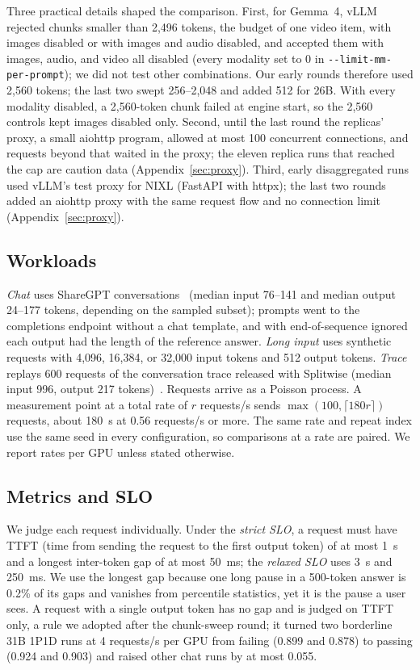\documentclass[11pt]{article}
\begin{document}
Three practical details shaped the comparison. First, for Gemma~4, vLLM rejected chunks smaller than 2,496 tokens, the budget of one video item, with images disabled or with images and audio disabled, and accepted them with images, audio, and video all disabled (every modality set to 0 in \texttt{-{}-limit-mm-per-prompt}); we did not test other combinations. Our early rounds therefore used 2,560 tokens; the last two swept 256--2,048 and added 512 for 26B. With every modality disabled, a 2,560-token chunk failed at engine start, so the 2,560 controls kept images disabled only. Second, until the last round the replicas' proxy, a small aiohttp program, allowed at most 100 concurrent connections, and requests beyond that waited in the proxy; the eleven replica runs that reached the cap are caution data (Appendix~\ref{sec:proxy}). Third, early disaggregated runs used vLLM's test proxy for NIXL (FastAPI with httpx); the last two rounds added an aiohttp proxy with the same request flow and no connection limit (Appendix~\ref{sec:proxy}).

\subsection{Workloads}
\emph{Chat} uses ShareGPT conversations~\cite{sharegpt} (median input 76--141 and median output 24--177 tokens, depending on the sampled subset); prompts went to the completions endpoint without a chat template, and with end-of-sequence ignored each output had the length of the reference answer. \emph{Long input} uses synthetic requests with 4,096, 16,384, or 32,000 input tokens and 512 output tokens. \emph{Trace} replays 600 requests of the conversation trace released with Splitwise (median input 996, output 217 tokens)~\cite{azuretrace}. Requests arrive as a Poisson process. A measurement point at a total rate of $r$ requests/s sends $\max(100, \lceil 180r\rceil)$ requests, about 180~s at 0.56 requests/s or more. The same rate and repeat index use the same seed in every configuration, so comparisons at a rate are paired. We report rates per GPU unless stated otherwise.

\subsection{Metrics and SLO}\label{sec:slo}
We judge each request individually. Under the \emph{strict SLO}, a request must have TTFT (time from sending the request to the first output token) of at most 1~s and a longest inter-token gap of at most 50~ms; the \emph{relaxed SLO} uses 3~s and 250~ms. We use the longest gap because one long pause in a 500-token answer is 0.2\% of its gaps and vanishes from percentile statistics, yet it is the pause a user sees. A request with a single output token has no gap and is judged on TTFT only, a rule we adopted after the chunk-sweep round; it turned two borderline 31B 1P1D runs at 4 requests/s per GPU from failing (0.899 and 0.878) to passing (0.924 and 0.903) and raised other chat runs by at most 0.055.
\end{document}
